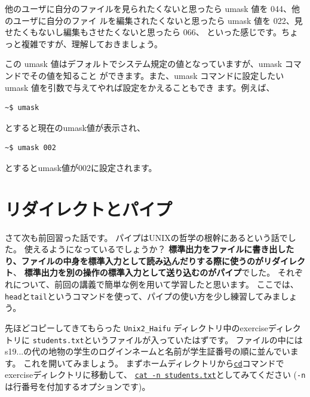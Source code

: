 \documentclass[a4j]{ltjreport}
\begin{document}
    他のユーザに自分のファイルを見られたくないと思ったら umask 値を 044、他のユーザに自分のファイ
    ルを編集されたくないと思ったら umask 値を 022、見せたくもないし編集もさせたくないと思ったら 066、
    といった感じです。ちょっと複雑ですが、理解しておきましょう。

    この umask 値はデフォルトでシステム規定の値となっていますが、umask コマンドでその値を知ること
    ができます。また、umask コマンドに設定したい umask 値を引数で与えてやれば設定をかえることもでき
    ます。例えば、

    \vspace*{1mm}
    \begin{lstlisting}[numbers=none]
        ~$ umask
    \end{lstlisting}
    \vspace*{1mm}

    とすると現在のumask値が表示され、

    \vspace*{1mm}
    \begin{lstlisting}[numbers=none]
        ~$ umask 002
    \end{lstlisting}
    \vspace*{1mm}
    とするとumask値が002に設定されます。




\pagebreak
    \section{リダイレクトとパイプ}
    さて次も前回習った話です。
    パイプはUNIXの哲学の根幹にあるという話でした。
    使えるようになっているでしょうか？
    \textbf{標準出力をファイルに書き出したり、ファイルの中身を標準入力として読み込んだりする際に使うのがリダイレクト}、
    \textbf{標準出力を別の操作の標準入力として送り込むのがパイプ}でした。
    それぞれについて、前回の講義で簡単な例を用いて学習したと思います。
    ここでは、\verb+head+と\verb+tail+というコマンドを使って、パイプの使い方を少し練習してみましょう。

    \vspace*{3mm}

    先ほどコピーしてきてもらった \verb+Unix2_Haifu+ ディレクトリ中のexerciseディレクトリに
    \verb+students.txt+というファイルが入っていたはずです。
    ファイルの中にはs19...の代の地物の学生のログインネームと名前が学生証番号の順に並んでいます。
    これを開いてみましょう。
    まずホームディレクトリから\underline{\texttt{cd}}コマンドでexerciseディレクトリに移動して、
    \underline{\texttt{cat -n students.txt}}としてみてください
    (\verb+-n+は行番号を付加するオプションです)。
\end{document}
